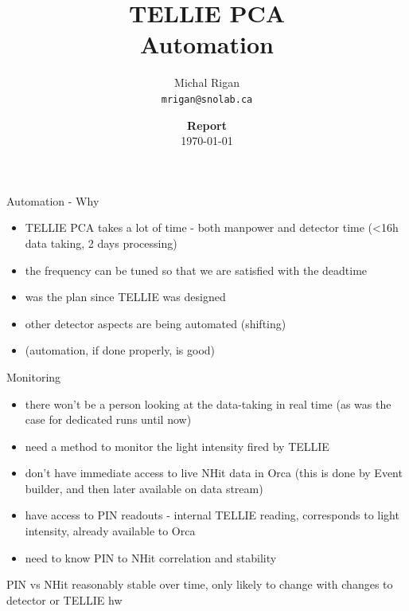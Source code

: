 \documentclass[xcolor=table]{beamer}
\title{TELLIE PCA\\Automation}
\author{Michal Rigan\\ %
          \texttt{mrigan@snolab.ca}} %
\date{\textbf{Report}\\
\today} %
\institute{University of Sussex} %
\begin{document}
{
\begin{frame}
  \titlepage %
\end{frame}
}

\begin{frame}{Automation - Why}
\begin{itemize}
	\item TELLIE PCA takes a lot of time - both manpower and detector time (<16h data taking, 2 days processing)
	\item the frequency can be tuned so that we are satisfied with the deadtime	
	\item was the plan since TELLIE was designed
	\item other detector aspects are being automated (shifting)
	\item (automation, if done properly, is good)
\end{itemize}
\end{frame}

\begin{frame}{Monitoring}
\begin{itemize}
	\item there won't be a person looking at the data-taking in real time (as was the case for dedicated runs until now)
	\item need a method to monitor the light intensity fired by TELLIE
	\item don't have immediate access to live NHit data in Orca (this is done by Event builder, and then later available on data stream)
	\item have access to PIN readouts - internal TELLIE reading, corresponds to light intensity, already available to Orca
	\item need to know PIN to NHit correlation and stability
\end{itemize}
\end{frame}

\begin{frame}{PIN vs NHit}
\noindent{}
\centering \small reasonably stable over time, only likely to change with changes to detector or TELLIE hw
\end{frame}
\end{document}
